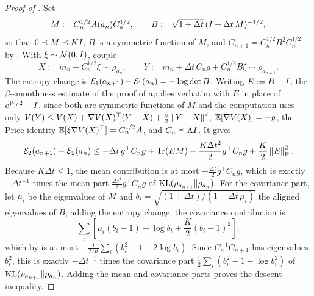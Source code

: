 \begin{proof}[Proof of ]
    Set
    \begin{equation*}
        M:=C_n^{1/2}A(a_n)C_n^{1/2},
        \qquad
        B:=\sqrt{1+\Delta t}\,(I+\Delta t\,M)^{-1/2},
    \end{equation*}
    so that $0\preceq M\preceq KI$, $B$ is a symmetric function of $M$, and
    $C_{n+1}=C_n^{1/2}B^2C_n^{1/2}$ by . With $\xi\sim\mathcal{N}(0,I)$, couple
    \begin{equation*}
        X:=m_n+C_n^{1/2}\xi\sim\rho_{a_n},
        \qquad
        Y:=m_n+\Delta t\,C_ng+C_n^{1/2}B\xi\sim\rho_{a_{n+1}} .
    \end{equation*}
    The entropy change is $\mathcal{E}_1(a_{n+1})-\mathcal{E}_1(a_n)=-\log\det B$. Writing
    $E:=B-I$, the $\beta$-smoothness estimate of the proof of  applies
    verbatim with $E$ in place of $e^{W/2}-I$, since both are symmetric functions of $M$ and
    the computation uses only
    $V(Y)\leq V(X)+\nabla V(X)^\top(Y-X)+\tfrac\beta2\left\lVert Y-X\right\rVert^2$, $\mathbb{E}[\nabla V(X)]=-g$, the
    Price identity $\mathbb{E}[\xi\nabla V(X)^\top]=C_n^{1/2}A$, and $C_n\preceq\Lambda I$. It gives
    \begin{equation*}
        \mathcal{E}_2(a_{n+1})-\mathcal{E}_2(a_n)
        \leq
        -\Delta t\,g^\top C_ng+\operatorname{Tr}(EM)
        +\frac{K\Delta t^2}2g^\top C_ng+\frac K2\left\lVert E\right\rVert_{\mathrm{F}}^2 .
    \end{equation*}
    Because $K\Delta t\leq1$, the mean contribution is at most
    $-\tfrac{\Delta t}2g^\top C_ng$, which is exactly $-\Delta t^{-1}$ times the mean part
    $\tfrac{\Delta t^2}2g^\top C_ng$ of $\mathrm{KL}(\rho_{a_{n+1}}\|\rho_{a_n})$. For the covariance
    part, let $\mu_i$ be the eigenvalues of $M$ and
    $b_i=\sqrt{(1+\Delta t)/(1+\Delta t\,\mu_i)}$ the aligned eigenvalues of $B$; adding the
    entropy change, the covariance contribution is
    \begin{equation*}
        \sum_i\left[\mu_i(b_i-1)-\log b_i+\frac K2(b_i-1)^2\right],
    \end{equation*}
    which by  is at most
    $-\tfrac1{2\Delta t}\sum_i(b_i^2-1-2\log b_i)$. Since $C_n^{-1}C_{n+1}$ has eigenvalues
    $b_i^2$, this is exactly $-\Delta t^{-1}$ times the covariance part
    $\tfrac12\sum_i(b_i^2-1-\log b_i^2)$ of $\mathrm{KL}(\rho_{a_{n+1}}\|\rho_{a_n})$. Adding the mean
    and covariance parts proves the descent inequality.


\end{proof}
